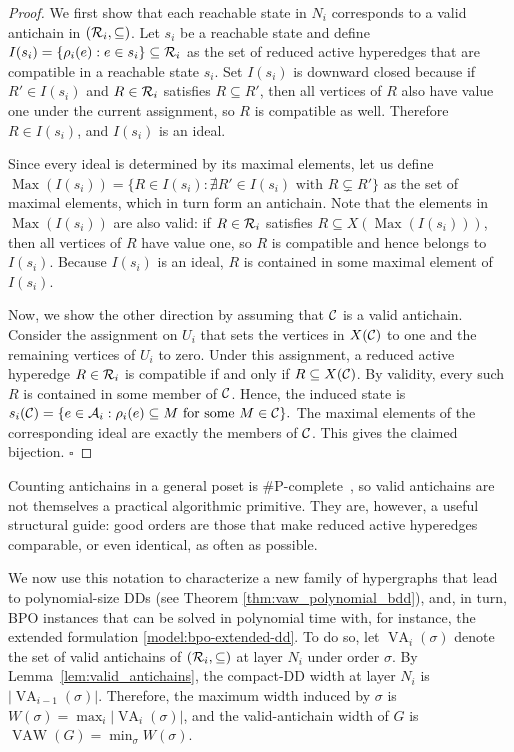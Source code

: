 \begin{proof}
We first show that each reachable state in $N_i$ corresponds to a valid antichain in $(\mathcal{R}_i,\subseteq)$. Let $s_i$ be a reachable state and define $I(s_i)=\{\rho_i(e):e\in s_i\}\subseteq\mathcal{R}_i$ as the set of reduced active hyperedges that are compatible in a reachable state $s_i$. Set $I(s_i)$ is downward closed because if $R'\in I(s_i)$ and $R\in\mathcal{R}_i$ satisfies $R\subseteq R'$, then all vertices of $R$ also have value one under the current assignment, so $R$ is compatible as well. Therefore $R\in I(s_i)$, and $I(s_i)$ is an ideal.

Since every ideal is determined by its maximal elements, let us define
$
\operatorname{Max}(I(s_i)) = \{R\in I(s_i): \nexists R'\in I(s_i)\text{ with }R\subsetneq R'\}
$
as the set of maximal elements, which in turn form an antichain. Note that the elements in $\operatorname{Max}(I(s_i))$ are also valid: if
$R\in\mathcal{R}_i$ satisfies $R\subseteq X(\operatorname{Max}(I(s_i)))$, then all
vertices of $R$ have value one, so $R$ is compatible and hence belongs to $I(s_i)$. Because $I(s_i)$ is an ideal, $R$ is contained in some maximal element of $I(s_i)$.

Now, we show the other direction by assuming that $\mathcal{C}$ is a valid antichain. Consider the assignment on $U_i$ that sets the vertices in $X(\mathcal{C})$ to one and the remaining vertices of $U_i$ to zero. Under this assignment, a reduced active hyperedge $R\in\mathcal{R}_i$ is
compatible if and only if $R\subseteq X(\mathcal{C})$. By validity, every such $R$ is
contained in some member of $\mathcal{C}$. Hence, the induced state is
$
s_i(\mathcal{C})=
\{e\in\mathcal{A}_i :
\rho_i(e)\subseteq M \text{ for some } M\in\mathcal{C}\}.
$
The maximal elements of the corresponding ideal are exactly the members of
$\mathcal{C}$. This gives the claimed bijection. \hfill$\square$
\end{proof}

Counting antichains in a general poset is \#P-complete~\cite{provanBall1983complexity},
so valid antichains are not themselves a practical algorithmic primitive. They are,
however, a useful structural guide: good orders are those that make reduced active
hyperedges comparable, or even identical, as often as possible.

We now use this notation to characterize a new family of hypergraphs that lead to polynomial-size DDs (see Theorem \ref{thm:vaw_polynomial_bdd}), and, in turn, BPO instances that can be solved in polynomial time with, for instance, the extended formulation \eqref{model:bpo-extended-dd}. To do so, let $\operatorname{VA}_i(\sigma)$ denote the set of valid antichains of
$(\mathcal{R}_i,\subseteq)$ at layer $N_i$ under order $\sigma$. By Lemma~\ref{lem:valid_antichains}, the compact-DD width at layer $N_{i}$ is $ |\operatorname{VA}_{i-1}(\sigma)|$. Therefore, the maximum width induced by $\sigma$ is $W(\sigma)=\max_i |\operatorname{VA}_i(\sigma)|$, and the valid-antichain width of $G$ is $\operatorname{VAW}(G)=\min_{\sigma} W(\sigma)$.

